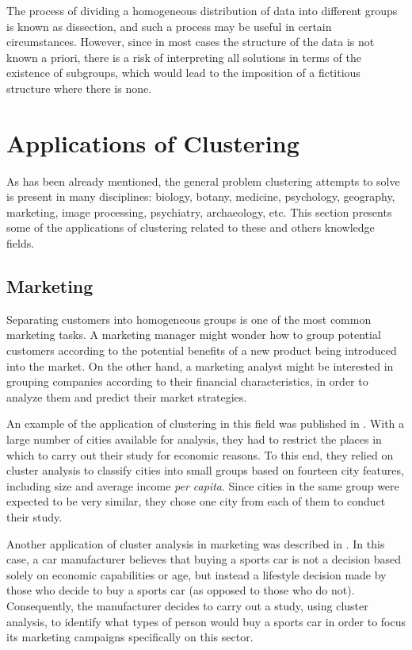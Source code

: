 The process of dividing a homogeneous distribution of data into different groups is known as dissection, and such a process may be useful in certain circumstances. However, since in most cases the structure of the data is not known a priori, there is a risk of interpreting all solutions in terms of the existence of subgroups, which would lead to the imposition of a fictitious structure where there is none.

\section{Applications of Clustering} \label{sec:ClusteringApplications}

As has been already mentioned, the general problem clustering attempts to solve is present in many disciplines: biology, botany, medicine, psychology, geography, marketing, image processing, psychiatry, archaeology, etc. This section presents some of the applications of clustering related to these and others knowledge fields.

\subsection{Marketing}

Separating customers into homogeneous groups is one of the most common marketing tasks. A marketing manager might wonder how to group potential customers according to the potential benefits of a new product being introduced into the market. On the other hand, a marketing analyst might be interested in grouping companies according to their financial characteristics, in order to analyze them and predict their market strategies.

An example of the application of clustering in this field was published in \cite{green1967cluster}. With a large number of cities available for analysis, they had to restrict the places in which to carry out their study for economic reasons. To this end, they relied on cluster analysis to classify cities into small groups based on fourteen city features, including size and average income \textit{per capita}. Since cities in the same group were expected to be very similar, they chose one city from each of them to conduct their study.

Another application of cluster analysis in marketing was described in \cite{chakrapani2004statistics}. In this case, a car manufacturer believes that buying a sports car is not a decision based solely on economic capabilities or age, but instead a lifestyle decision made by those who decide to buy a sports car (as opposed to those who do not). Consequently, the manufacturer decides to carry out a study, using cluster analysis, to identify what types of person would buy a sports car in order to focus its marketing campaigns specifically on this sector.

